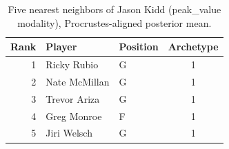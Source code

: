 \begin{table}[htbp]
  \centering\small
  \begin{tabular}{rllc}
    \toprule
    Rank & Player & Position & Archetype \\
    \midrule
    1 & Ricky Rubio & G & 1 \\
    2 & Nate McMillan & G & 1 \\
    3 & Trevor Ariza & G & 1 \\
    4 & Greg Monroe & F & 1 \\
    5 & Jiri Welsch & G & 1 \\
    \bottomrule
  \end{tabular}
  \caption{Five nearest neighbors of Jason Kidd (peak_value modality), Procrustes-aligned posterior mean.}
  \label{tab:Jason_Kidd_neighbors_peak_value}
\end{table}

